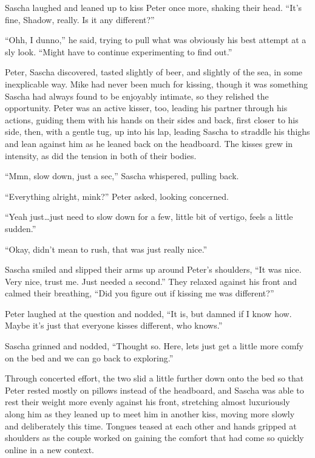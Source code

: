 Sascha laughed and leaned up to kiss Peter once more, shaking their head. ``It's fine, Shadow, really. Is it any different?''

``Ohh, I dunno,'' he said, trying to pull what was obviously his best attempt at a sly look. ``Might have to continue experimenting to find out.''

Peter, Sascha discovered, tasted slightly of beer, and slightly of the sea, in some inexplicable way. Mike had never been much for kissing, though it was something Sascha had always found to be enjoyably intimate, so they relished the opportunity. Peter was an active kisser, too, leading his partner through his actions, guiding them with his hands on their sides and back, first closer to his side, then, with a gentle tug, up into his lap, leading Sascha to straddle his thighs and lean against him as he leaned back on the headboard. The kisses grew in intensity, as did the tension in both of their bodies.

``Mmn, slow down, just a sec,'' Sascha whispered, pulling back.

``Everything alright, mink?'' Peter asked, looking concerned.

``Yeah just\ldots{}just need to slow down for a few, little bit of vertigo, feels a little sudden.''

``Okay, didn't mean to rush, that was just really nice.''

Sascha smiled and slipped their arms up around Peter's shoulders, ``It was nice. Very nice, trust me. Just needed a second.'' They relaxed against his front and calmed their breathing, ``Did you figure out if kissing me was different?''

Peter laughed at the question and nodded, ``It is, but damned if I know how. Maybe it's just that everyone kisses different, who knows.''

Sascha grinned and nodded, ``Thought so. Here, lets just get a little more comfy on the bed and we can go back to exploring.''

Through concerted effort, the two slid a little further down onto the bed so that Peter rested mostly on pillows instead of the headboard, and Sascha was able to rest their weight more evenly against his front, stretching almost luxuriously along him as they leaned up to meet him in another kiss, moving more slowly and deliberately this time. Tongues teased at each other and hands gripped at shoulders as the couple worked on gaining the comfort that had come so quickly online in a new context.

